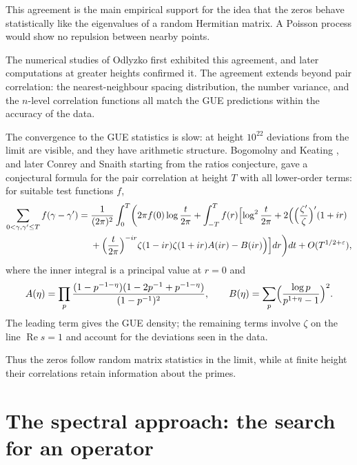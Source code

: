 \documentclass[11pt]{amsart}
\theoremstyle{definition}
\theoremstyle{remark}
\begin{document}
This agreement is the main empirical support for the idea that the zeros behave statistically like the eigenvalues of a random Hermitian matrix. A Poisson process would show no repulsion between nearby points.

The numerical studies of Odlyzko \cite{odlyzko1987} first exhibited this agreement, and later computations at greater heights confirmed it. The agreement extends beyond pair correlation: the nearest-neighbour spacing distribution, the number variance, and the $n$-level correlation functions all match the GUE predictions within the accuracy of the data.

The convergence to the GUE statistics is slow: at height $10^{22}$ deviations from the limit are visible, and they have arithmetic structure. Bogomolny and Keating \cite{bogomolny1996}, and later Conrey and Snaith \cite{conrey2007} starting from the ratios conjecture, gave a conjectural formula for the pair correlation at height $T$ with all lower-order terms: for suitable test functions $f$,
\begin{equation}\label{eq:bk}
\begin{aligned}
\sum_{0<\gamma,\gamma'\le T}f(\gamma-\gamma')={}&\frac1{(2\pi)^2}\int_0^T\biggl(2\pi f(0)\log\frac t{2\pi}+\int_{-T}^{T}f(r)\Bigl[\log^2\frac t{2\pi}+2\Bigl(\Bigl(\frac{\zeta'}{\zeta}\Bigr)'(1+ir)\\
&+\Bigl(\frac t{2\pi}\Bigr)^{-ir}\zeta(1-ir)\zeta(1+ir)A(ir)-B(ir)\Bigr)\Bigr]dr\biggr)dt+O(T^{1/2+\varepsilon}),
\end{aligned}
\end{equation}
where the inner integral is a principal value at $r=0$ and
\[
A(\eta)=\prod_p\frac{(1-p^{-1-\eta})(1-2p^{-1}+p^{-1-\eta})}{(1-p^{-1})^2},\qquad B(\eta)=\sum_p\Bigl(\frac{\log p}{p^{1+\eta}-1}\Bigr)^2 .
\]
The leading term gives the GUE density; the remaining terms involve $\zeta$ on the line $\operatorname{Re}s=1$ and account for the deviations seen in the data.

Thus the zeros follow random matrix statistics in the limit, while at finite height their correlations retain information about the primes.

\section{The spectral approach: the search for an operator}\label{sec:spectral}
\end{document}
